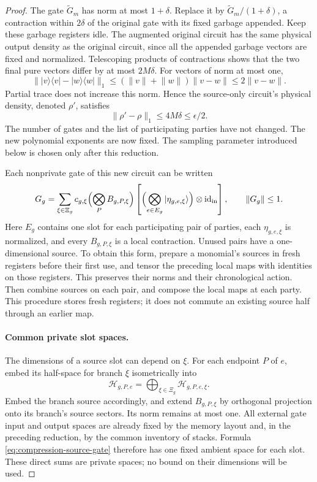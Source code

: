 \documentclass[11pt]{article}
\numberwithin{equation}{section}
\theoremstyle{definition}
\theoremstyle{remark}
\begin{document}
\begin{proof}
The gate $\widetilde G_m$ has norm at most $1+\delta$.  Replace it by
$\widetilde G_m/(1+\delta)$, a contraction within $2\delta$ of the
original gate with its fixed garbage appended.  Keep these garbage
registers idle.  The augmented original circuit has the same physical
output density as the original circuit, since all the appended garbage
vectors are fixed and normalized.  Telescoping products of contractions
shows that the two final pure vectors differ by at most $2M\delta$.
For vectors of norm at most one,
\[
 \lVert |v\rangle\langle v|-|w\rangle\langle w|\rVert_1
       \le(\lVert v\rVert+\lVert w\rVert)\lVert v-w\rVert
       \le2\lVert v-w\rVert.
\]
Partial trace does not increase this norm.  Hence the source-only
circuit's physical density, denoted $\rho'$, satisfies
\begin{equation}
 \lVert \rho'-\rho\rVert_1\le4M\delta\le\epsilon/2.
 \label{eq:compression-effect-circuit-error}
\end{equation}
The number of gates and the list of participating parties have not
changed.  The new polynomial exponents are now fixed.  The sampling
parameter introduced below is chosen only after this reduction.

Each nonprivate gate of this new circuit can be written
\begin{equation}
 G_g=\sum_{\xi\in\Xi_g}c_{g,\xi}
       \Bigl(\bigotimes_{P}B_{g,P,\xi}\Bigr)
       \left[\Bigl(\bigotimes_{e\in E_g}
                         |\eta_{g,e,\xi}\rangle\Bigr)
                    \otimes\operatorname{id}_{\mathrm{in}}\right],
 \qquad \lVert G_g\rVert\le1.
 \label{eq:compression-source-gate}
\end{equation}
Here $E_g$ contains one slot for each participating pair of parties,
each $\eta_{g,e,\xi}$ is normalized, and every $B_{g,P,\xi}$ is a local
contraction.  Unused pairs have a one-dimensional source.  To obtain
this form, prepare a monomial's sources in fresh registers before their
first use, and tensor the preceding local maps with identities on those
registers.  This preserves their norms and their chronological action.
Then combine sources on each pair, and compose the local maps at each
party.  This procedure stores fresh registers; it does not commute an
existing source half through an earlier map.

\paragraph{Common private slot spaces.}
The dimensions of a source slot can depend on $\xi$.  For each endpoint
$P$ of $e$, embed its half-space for branch $\xi$ isometrically into
\[
 \mathcal H_{g,P,e}
       =\bigoplus_{\xi\in\Xi_g}\mathcal H_{g,P,e,\xi}.
\]
Embed the branch source accordingly, and extend $B_{g,P,\xi}$ by
orthogonal projection onto its branch's source sectors.  Its norm
remains at most one.  All external gate input and output spaces are
already fixed by the memory layout and, in the preceding reduction, by
the common inventory of stacks.  Formula
\eqref{eq:compression-source-gate} therefore has one fixed ambient
space for each slot.  These direct sums are private spaces; no bound on
their dimensions will be used.


\end{proof}
\end{document}
